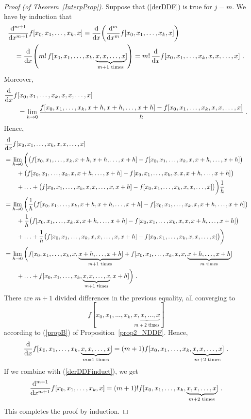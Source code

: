 \begin{proof}[Proof (of Theorem~\ref{InterpProp})]
Suppose that (\ref{derDDF}) is true for $j=m$.  We have by induction
that
\begin{equation} \label{derDDFinduct}
\begin{split}
&\dfdxn{f[x_0,x_1,\ldots,x_k,x]}{x}{m+1} =
\dfdx{\left(\dfdxn{f[x_0,x_1,\ldots,x_k,x]}{x}{m}\right)}{x} \\
&\quad = \dfdx{\left( m!\,f[x_0,x_1,\ldots, x_k,
\underbrace{x,x,\ldots,x}_{m+1 \text{ times}}] \right)}{x}
= m!\, \dfdx{f[x_0,x_1,\ldots, x_k, x,x,\ldots,x]}{x} \ .
\end{split}
\end{equation}
Moreover,
\begin{align*}
&\dfdx{f[x_0,x_1,\ldots, x_k, x,x,\ldots,x]}{x}  \\
&\qquad = \lim_{h\rightarrow 0}
\frac{f[x_0,x_1,\ldots, x_k, x+h,x+h,\ldots,x+h]-
f[x_0,x_1,\ldots, x_k, x,x,\ldots,x]}{h} \ .
\end{align*}
Hence,
\begin{align*}
&\dfdx{f[x_0,x_1,\ldots, x_k, x,x,\ldots,x]}{x} \\
&= \lim_{h\rightarrow 0} \bigg(
\big(f[x_0,x_1,\ldots, x_k, x+h,x+h,\ldots,x+h]-
f[x_0,x_1,\ldots, x_k, x,x+h,\ldots,x+h]\big) \\
&\qquad +\big(f[x_0,x_1,\ldots, x_k, x,x+h,\ldots,x+h]-
f[x_0,x_1,\ldots, x_k, x,x,x+h,\ldots,x+h] \big) \\
&\qquad + \ldots +\big(f[x_0,x_1,\ldots, x_k, x,x,\ldots,x,x+h]-
f[x_0,x_1,\ldots, x_k, x,x,\ldots,x]\big) \bigg)\frac{1}{h} \\
&= \lim_{h\rightarrow 0} \bigg(
\frac{1}{h}\big(f[x_0,x_1,\ldots, x_k, x+h,x+h,\ldots,x+h]-
 f[x_0,x_1,\ldots, x_k, x,x+h,\ldots,x+h]\big) \\
&\qquad +\frac{1}{h}\big(f[x_0,x_1,\ldots, x_k, x,x+h,\ldots,x+h]-
f[x_0,x_1,\ldots, x_k, x,x,x+h,\ldots,x+h] \big) \\
&\qquad + \ldots
+\frac{1}{h}\big(f[x_0,x_1,\ldots, x_k, x,x,\ldots,x,x+h]-
f[x_0,x_1,\ldots, x_k, x,x,\ldots,x]\big) \bigg) \\
&= \lim_{h\rightarrow 0} \bigg( f[x_0,x_1,\ldots, x_k, x,
\underbrace{x+h,\ldots,x+h}_{m+1 \text{ times}}]
+f[x_0,x_1,\ldots, x_k, x,x,
\underbrace{x+h,\ldots,x+h}_{m \text{ times}}] \\
&\qquad + \ldots +f[x_0,x_1,\ldots, x_k,
\underbrace{x,x,\ldots,x}_{m+1 \text{ times}},x+h] \bigg) \ .
\end{align*}
There are $m+1$ divided differences in the previous equality, all
converging to
\[
f[x_0,x_1,\ldots,x_k,\underbrace{x,x,\ldots,x}_{m+2 \text{ times}}]
\]
according to (\ref{propB}) of Proposition~\ref{prop2_NDDF}.  Hence,
\[
\dfdx{f[x_0,x_1,\ldots, x_k,\underbrace{x,x,\ldots,x}_{m=1\text{ times}}]}{x}
= (m+1)
f[x_0,x_1,\ldots,x_k,\underbrace{x,x,\ldots,x}_{m+2 \text{ times}}] \ .
\]
If we combine with (\ref{derDDFinduct}), we get
\[
\dfdxn{f[x_0,x_1,\ldots,x_k,x]}{x}{m+1} = (m+1)!
f[x_0,x_1,\ldots,x_k,\underbrace{x,x,\ldots,x}_{m+2 \text{ times}}] \ .
\]
This completes the proof by induction.
\end{proof}

